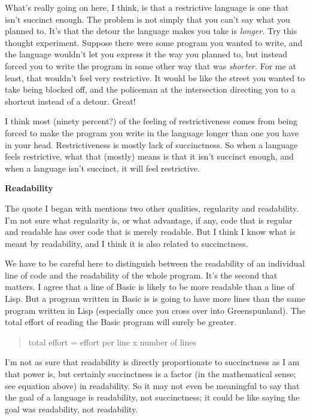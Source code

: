 \documentclass[12pt]{book}
\begin{document}
What's really going on here, I think, is that a restrictive language is
one that isn't succinct enough. The problem is not simply that you can't
say what you planned to. It's that the detour the language makes you
take is \emph{longer.} Try this thought experiment. Suppose there were
some program you wanted to write, and the language wouldn't let you
express it the way you planned to, but instead forced you to write the
program in some other way that was \emph{shorter.} For me at least, that
wouldn't feel very restrictive. It would be like the street you wanted
to take being blocked off, and the policeman at the intersection
directing you to a shortcut instead of a detour. Great!

I think most (ninety percent?) of the feeling of restrictiveness comes
from being forced to make the program you write in the language longer
than one you have in your head. Restrictiveness is mostly lack of
succinctness. So when a language feels restrictive, what that (mostly)
means is that it isn't succinct enough, and when a language isn't
succinct, it will feel restrictive.

\textbf{Readability}

The quote I began with mentions two other qualities, regularity and
readability. I'm not sure what regularity is, or what advantage, if any,
code that is regular and readable has over code that is merely readable.
But I think I know what is meant by readability, and I think it is also
related to succinctness.

We have to be careful here to distinguish between the readability of an
individual line of code and the readability of the whole program. It's
the second that matters. I agree that a line of Basic is likely to be
more readable than a line of Lisp. But a program written in Basic is is
going to have more lines than the same program written in Lisp
(especially once you cross over into Greenspunland). The total effort of
reading the Basic program will surely be greater.

\begin{quote}
total effort = effort per line x number of lines
\end{quote}

I'm not as sure that readability is directly proportionate to
succinctness as I am that power is, but certainly succinctness is a
factor (in the mathematical sense; see equation above) in readability.
So it may not even be meaningful to say that the goal of a language is
readability, not succinctness; it could be like saying the goal was
readability, not readability.
\end{document}
